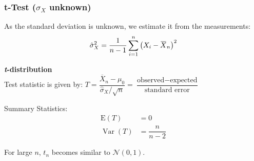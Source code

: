 \documentclass[11pt]{article}
\newcommand*\samplemean[1]{\overline{#1}}
\newcommand*\N[1]{\mathcal{N}\left(#1\right)}
\newcommand*\Var[1]{\mathop{\text{Var}}\left(#1\right)}
\newcommand{\overbar}[1]{\mkern 1.5mu\overline{\mkern-1.5mu#1\mkern-1.5mu}\mkern 1.5mu}
\begin{document}
\subsubsection{t-Test ($\sigma_X$ unknown)}
As the standard deviation is unknown, we estimate it from the measurements:
\begin{equation*}
	\hat{\sigma}^2_X = \frac{1}{n-1} \sum_{i=1}^{n}\left(X_i-\overbar{X}_n\right)^2
\end{equation*}

\begin{definition}
	\textbf{\textit{t}-distribution}\\
	Test statistic is given by:
	$T=\dfrac{\samplemean{X}_n-\mu_0}{\hat{\sigma}_X/\sqrt{n}} =\dfrac{\text{observed} - \text{expected}}{\text{standard error}}$
\end{definition}

\noindent
Summary Statistics: 
\begin{align*}
	\text{E}(T) &= 0\\
	\Var{T} &= \dfrac{n}{n-2}
\end{align*}

\noindent
For large $n$, $t_n$ becomes similar to $\N{0, 1}$. 
\end{document}
